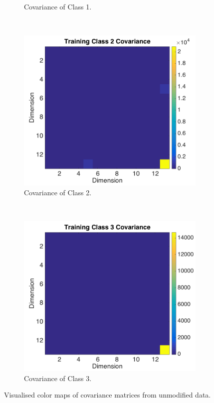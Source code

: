 \documentclass[a4paper, 10pt, conference]{ieeeconf}
\begin{document}
\begin{figure}[!ht]
\begin{subfigure}{0.45\textwidth}
      \caption{Covariance of Class 1.}
      \label{fig:covclass1}
    \end{subfigure}
    \\
    \begin{subfigure}{0.45\textwidth}
      \includegraphics[width=\textwidth]{pic/covclass2.png}
      \caption{Covariance of Class 2.}
      \label{fig:covclass2}
    \end{subfigure}
    ~
    \begin{subfigure}{0.45\textwidth}
      \includegraphics[width=\textwidth]{pic/covclass3.png}
      \caption{Covariance of Class 3.}
      \label{fig:covclass3}
    \end{subfigure}
	\caption{Visualised color maps of covariance matrices from unmodified data.}
  \label{fig:covtrainingall}
\end{figure}
\newpage
\end{document}
